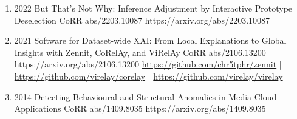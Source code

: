 {\begin{enumerate}
        \item {}
                        {2022}
                        {But That's Not Why: Inference Adjustment by Interactive Prototype Deselection}
                        {CoRR abs/2203.10087}
                        {https://arxiv.org/abs/2203.10087}

        \item {}
                        {2021}
                        {Software for Dataset-wide XAI: From Local Explanations to Global Insights with Zennit, CoRelAy, and ViRelAy}
                        {CoRR abs/2106.13200}
                        {https://arxiv.org/abs/2106.13200}
                        {   \href{https://github.com/chr5tphr/zennit}{https://github.com/chr5tphr/zennit} | \\
                            \href{https://github.com/virelay/corelay}{https://github.com/virelay/corelay} |
                            \href{https://github.com/virelay/virelay}{https://github.com/virelay/virelay}
                        }

        \item {}
                        {2014}
                        {Detecting Behavioural and Structural Anomalies in Media-Cloud Applications}
                        {CoRR abs/1409.8035}
                        {https://arxiv.org/abs/1409.8035}

    \end{enumerate}

}


